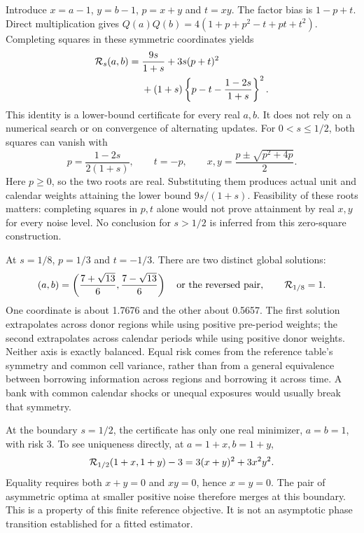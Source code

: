Introduce $x=a-1$, $y=b-1$, $p=x+y$ and $t=xy$. The factor bias is
$1-p+t$. Direct multiplication gives
$Q(a)Q(b)=4(1+p+p^2-t+pt+t^2)$. Completing squares in these symmetric
coordinates yields
\begin{equation}
 \begin{split}
 {\cal R}_s(a,b)
  ={}&\frac{9s}{1+s}+3s(p+t)^2\\
     &+(1+s)\left\{p-t-\frac{1-2s}{1+s}\right\}^2.
 \end{split}
 \label{exec17:s6-joint-certificate}
\end{equation}
This identity is a lower-bound certificate for every real $a,b$. It does
not rely on a numerical search or on convergence of alternating updates.
For $0<s\leq1/2$, both squares can vanish with
\begin{equation}
 p=\frac{1-2s}{2(1+s)},\qquad t=-p,\qquad
 x,y=\frac{p\mathbin{\pm}\sqrt{p^2+4p}}{2}.
 \label{exec17:s6-joint-global}
\end{equation}
Here $p\geq0$, so the two roots are real. Substituting them produces actual
unit and calendar weights attaining the lower bound $9s/(1+s)$. Feasibility
of these roots matters: completing squares in $p,t$ alone would not prove
attainment by real $x,y$ for every noise level. No conclusion for $s>1/2$
is inferred from this zero-square construction.

At $s=1/8$, $p=1/3$ and $t=-1/3$. There are two distinct global solutions:
\begin{equation}
 (a,b)=\left(\frac{7+\sqrt{13}}6,\frac{7-\sqrt{13}}6\right)
 \quad\hbox{or the reversed pair},\qquad
 {\cal R}_{1/8}=1.
 \label{exec17:s6-joint-numeric}
\end{equation}
One coordinate is about 1.7676 and the other about 0.5657. The first
solution extrapolates across donor regions while using positive pre-period
weights; the second extrapolates across calendar periods while using
positive donor weights. Neither axis is exactly balanced. Equal risk comes
from the reference table's symmetry and common cell variance, rather than
from a general equivalence between borrowing information across regions
and borrowing it across time. A bank with common calendar shocks or unequal
exposures would usually break that symmetry.

At the boundary $s=1/2$, the certificate has only one real minimizer,
$a=b=1$, with risk 3. To see uniqueness directly, at $a=1+x,b=1+y$,
\begin{equation}
 {\cal R}_{1/2}(1+x,1+y)-3
   =3(x+y)^2+3x^2y^2.
 \label{exec17:s6-joint-boundary}
\end{equation}
Equality requires both $x+y=0$ and $xy=0$, hence $x=y=0$. The pair of
asymmetric optima at smaller positive noise therefore merges at this
boundary. This is a property of this finite reference objective. It is
not an asymptotic phase transition established for a fitted estimator.

